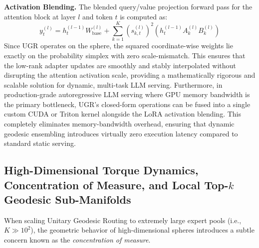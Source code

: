 \documentclass{article}
\theoremstyle{plain}
\theoremstyle{definition}
\theoremstyle{remark}
\begin{document}
\textbf{Activation Blending.} The blended query/value projection forward pass for the attention block at layer $l$ and token $t$ is computed as:
\begin{equation}
y_t^{(l)} = h_t^{(l-1)} W_{\text{base}}^{(l)} + \sum_{k=1}^K \left(s_{k, t}^{(l)}\right)^2 \left( h_t^{(l-1)} A_k^{(l)} B_k^{(l)} \right)
\end{equation}
Since UGR operates on the sphere, the squared coordinate-wise weights lie exactly on the probability simplex with zero scale-mismatch. This ensures that the low-rank adapter updates are smoothly and stably interpolated without disrupting the attention activation scale, providing a mathematically rigorous and scalable solution for dynamic, multi-task LLM serving. Furthermore, in production-grade autoregressive LLM serving where GPU memory bandwidth is the primary bottleneck, UGR's closed-form operations can be fused into a single custom CUDA or Triton kernel alongside the LoRA activation blending. This completely eliminates memory-bandwidth overhead, ensuring that dynamic geodesic ensembling introduces virtually zero execution latency compared to standard static serving.

\subsection{High-Dimensional Torque Dynamics, Concentration of Measure, and Local Top-$k$ Geodesic Sub-Manifolds}
\label{appendix:high_dim_torque}
When scaling Unitary Geodesic Routing to extremely large expert pools (i.e., $K \gg 10^2$), the geometric behavior of high-dimensional spheres introduces a subtle concern known as the \emph{concentration of measure}. 
\end{document}
